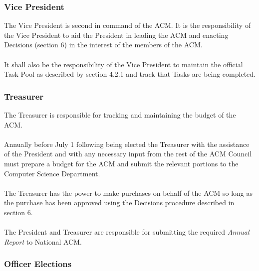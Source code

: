 \documentclass[12pt,titlepage]{article}
\begin{document}
\subsubsection{Vice President}

The Vice President is second in command of the ACM. It is the responsibility of the Vice President to aid the President in leading the ACM and enacting Decisions (section 6) in the interest of the members of the ACM.\\
\\
It shall also be the responsibility of the Vice President to maintain the official Task Pool as described by section 4.2.1 and track that Tasks are being completed.

\subsubsection{Treasurer}

The Treasurer is responsible for tracking and maintaining the budget of the ACM.\\
\\
Annually before July 1 following being elected the Treasurer with the assistance of the President and with any necessary input from the rest of the ACM Council must prepare a budget for the ACM and submit the relevant portions to the Computer Science Department.\\
\\
The Treasurer has the power to make purchases on behalf of the ACM so long as the purchase has been approved using the Decisions procedure described in section 6.\\
\\
The President and Treasurer are responsible for submitting the required \emph{Annual Report} to National ACM.

\subsubsection{Officer Elections}
\end{document}
